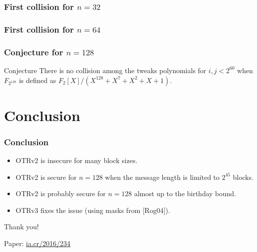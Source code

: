 \documentclass{beamer}
\begin{document}
	\begin{frame}
		\frametitle{First collision for $n=32$}
		
		\centering
		\scalebox{0.8}{
			
			}
	\end{frame}
	\begin{frame}
		\frametitle{First collision for $n=64$}
		
		\centering
		\scalebox{0.8}{
			
			}
	\end{frame}


	\begin{frame}
		\frametitle{Conjecture for $n=128$}
		
		\begin{block}{Conjecture}
			There is no collision among the tweaks polynomials for $i, j < 2^{60}$ when $F_{2^{128}}$ is defined as $F_2[X]/(X^{128}+X^{7}+X^{2}+X+1)$.
		\end{block}
	\end{frame}


\section*{Conclusion} %
\label{sec:conclusion}

	\begin{frame}
		\frametitle{Conclusion}
		
		\begin{itemize}
			\item OTRv2 is insecure for many block sizes.
			\item OTRv2 is secure for $n = 128$ when the message length is limited to $2^{45}$ blocks.
			\item OTRv2 is probably secure for $n = 128$ almost up to the birthday bound.
			\item OTRv3 fixes the issue (using masks from [Rog04]).
		\end{itemize}
	\end{frame}


	\begin{frame}

		\begin{center}
			{\Large Thank you!}
			
			\vspace{1cm}
			Paper: \href{http://ia.cr/2016/234}{ia.cr/2016/234}
		\end{center}
	\end{frame}
	
\end{document}
